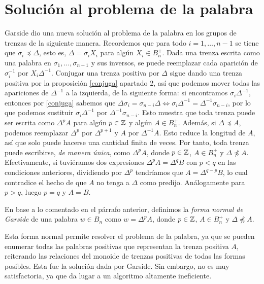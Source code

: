 \documentclass[TFG.tex]{subfiles}
\begin{document}
\section{Solución al problema de la palabra}
Garside dio una nueva solución al problema de la palabra en los grupos de trenzas de la siguiente manera. Recordemos que para todo $i=1,\dots, n-1$ se tiene que $\sigma_i\preccurlyeq\Delta$, esto es, $\Delta=\sigma_iX_i$ para algún $X_i\in B_n^+$. Dada una trenza escrita como una palabra en $\sigma_1,\dots,\sigma_{n-1}$ y sus inversos, se puede reemplazar cada aparición de $\sigma_i^{-1}$ por $X_i\Delta^{-1}$. Conjugar una trenza positiva por $\Delta$ sigue dando una trenza positiva por la proposición \ref{conjuga} apartado 2, así que podemos mover todas las apariciones de $\Delta^{-1}$ a la izquierda, de la siguiente forma: si encontramos $\sigma_i\Delta^{-1}$, entonces por \ref{conjuga} sabemos que $\Delta\sigma_{i}=\sigma_{n-i}\Delta\Leftrightarrow  \sigma_i\Delta^{-1}=\Delta^{-1}\sigma_{n-i}$, por lo que podemos sustituir $\sigma_i\Delta^{-1}$ por $\Delta^{-1}\sigma_{n-i}$. Esto muestra que toda trenza puede ser escrita como $\Delta^p A$ para algún $p\in\mathbb{Z}$ y algún $A\in B_n^+$. Además, si $\Delta\preccurlyeq A$, podemos reemplazar $\Delta^p$ por $\Delta^{p+1}$ y $A$ por $\Delta^{-1}A$. Esto reduce la longitud de $A$, así que solo puede hacerse una cantidad finita de veces. Por tanto, toda trenza puede escribirse, \emph{de manera única}, como $\Delta^pA$, donde $p\in\mathbb{Z}$, $A\in B_n^+$ y $\Delta\not\preccurlyeq A$. Efectivamente, si tuviéramos dos expresiones $\Delta^pA=\Delta^q B$ con $p<q$ en las condiciones anteriores, dividiendo por $\Delta^p$ tendríamos que $A=\Delta^{q-p}B$, lo cual contradice el hecho de que $A$ no tenga a $\Delta$ como predijo. Análogamente para $p>q$, luego $p=q$ y $A=B$.

\begin{defi}
En base a lo comentado en el párrafo anterior, definimos la \emph{forma normal de Garside} de una palabra $w\in B_n$ como $w=\Delta^pA$, donde $p\in\mathbb{Z}$, $A\in B_n^+$ y $\Delta\not\preccurlyeq A$. 
\end{defi}

Esta forma normal permite resolver el problema de la palabra, ya que se pueden enumerar todas las palabras positivas que representan la trenza positiva $A$, reiterando las relaciones del monoide de trenzas positivas de todas las formas posibles. Esta fue la solución dada por Garside. Sin embargo, no es muy satisfactoria, ya que da lugar a un algoritmo altamente ineficiente.
\end{document}
